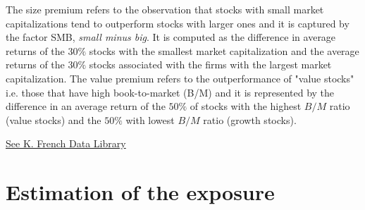 \documentclass[hidelinks,11pts]{article}
\DeclareMathOperator{\1}{\mathbbm{1}}
\begin{document}
The size premium refers to the observation that stocks with small market capitalizations tend to outperform stocks with larger ones and it is captured by the factor SMB, \emph{small minus big}.
It is computed as the difference in average returns of the $30\%$ stocks with the smallest market capitalization and the average returns of the $30\%$ stocks associated with the firms with the largest market capitalization. 
The value premium refers to the outperformance of "value stocks" i.e. those that have high book-to-market (B/M) and it is represented by the difference in an average return of the $50\%$ of stocks with the highest $B/M$ ratio (value stocks) and the $50\%$ with lowest $B/M$ ratio (growth stocks). 

\begin{comment}
    
    The Fama/French factors are constructed using the 6 value-weight portfolios formed on size and book-to-market. (See the description of the 6 size/book-to-market portfolios.)
    
    SMB (Small Minus Big) is the average return on the three small portfolios minus the average return on the three big portfolios,
    
    
    SMB = 1/3 (Small Value + Small Neutral + Small Growth) - 1/3 (Big Value + Big Neutral + Big Growth).	 
    
    HML (High Minus Low) is the average return on the two value portfolios minus the average return on the two growth portfolios,
    
    
    HML = 1/2 (Small Value + Big Value) - 1/2 (Small Growth + Big Growth).	 
    
    Rm-Rf, the excess return on the market, value-weight return of all CRSP firms incorporated in the US and listed on the NYSE, AMEX, or NASDAQ that have a CRSP share code of 10 or 11 at the beginning of month t, good shares and price data at the beginning of t, and good return data for t minus the one-month Treasury bill rate (from Ibbotson Associates).
    
    See Fama and French, 1993, "Common Risk Factors in the Returns on Stocks and Bonds," Journal of Financial Economics, for a complete description of the factor returns.
\end{comment}
    
    
    \href{https://mba.tuck.dartmouth.edu/pages/faculty/ken.french/data_library.html}{See K. French Data Library}


\section{Estimation of the exposure}
\end{document}
